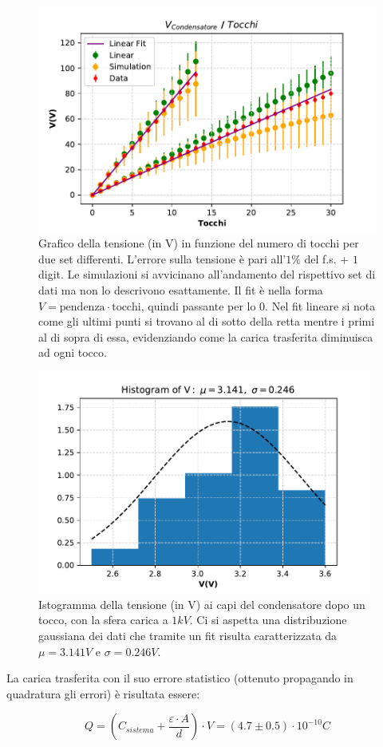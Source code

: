 {\fontsize{12}{14}\selectfont 

\begin{figure}[H]
  \centering
  \includegraphics[width=13cm]{Figures/Grafico_Parte2.pdf}
  \caption{Grafico della tensione (in V) in funzione del numero di tocchi per due set differenti. L'errore sulla tensione è pari all'$1\%$ del f.s. + $1$ digit. Le simulazioni si avvicinano all'andamento del rispettivo set di dati ma non lo descrivono esattamente. Il fit è nella forma $V = \text{pendenza} \cdot \text{tocchi}$, quindi passante per lo 0. Nel fit lineare si nota come gli ultimi punti si trovano al di sotto della retta mentre i primi al di sopra di essa, evidenziando come la carica trasferita diminuisca ad ogni tocco.}
  \label{fig:GraficoParteII}
\end{figure}

\begin{figure}[H]
  \centering
  \includegraphics[width=11cm]{Figures/Grafico_Parte2_Carica_Trasferita.pdf}
  \caption{Istogramma della tensione (in V) ai capi del condensatore dopo un tocco, con la sfera carica a $1 kV$. Ci si aspetta una distribuzione gaussiana dei dati che tramite un fit risulta caratterizzata da $\mu = 3.141 V$ e $\sigma = 0.246 V$.}
  \label{fig:GraficoParteIICarica}
\end{figure}

La carica trasferita con il suo errore statistico (ottenuto propagando in quadratura gli errori) è risultata essere:

\begin{equation*}
    Q = \left(C_{sistema} + \dfrac{\varepsilon \cdot A}{d}\right) \cdot V = (4.7 \pm 0.5)\cdot 10^{-10} C
\end{equation*}



\par}
